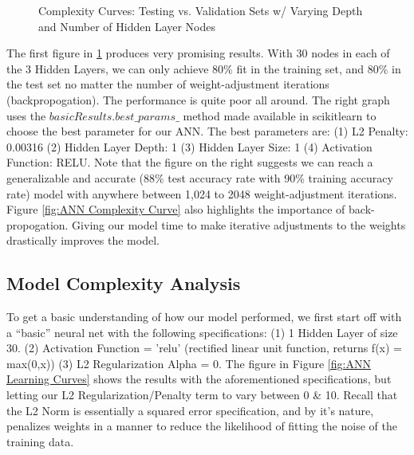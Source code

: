 \documentclass[letterpaper,12pt]{article}
\begin{document}
\begin{figure} %
  \centering
  \hspace{8pt}%
  \caption{Complexity Curves:  Testing vs. Validation Sets w/ Varying Depth and Number of Hidden Layer Nodes}\label{fig:ANN Complexity Curves}
\end{figure}


The first figure in \ref{fig:ANN Complexity Curves} produces very promising results.  With 30 nodes in each of the 3 Hidden Layers, we can only achieve 80\% fit in the training set, and 80\% in the test set no matter the number of weight-adjustment iterations (backpropogation).  The performance is quite poor all around.  The right graph uses the $basicResults.best\_params\_$ method made available in scikitlearn to choose the best parameter for our ANN.  The best parameters are:  (1) L2 Penalty: 0.00316 (2) Hidden Layer Depth: 1 (3) Hidden Layer Size: 1 (4) Activation Function: RELU.  Note that the figure on the right suggests we can reach a generalizable and accurate (88\% test accuracy rate with 90\% training accuracy rate) model with anywhere between 1,024 to 2048 weight-adjustment iterations.  Figure \ref{fig:ANN Complexity Curve} also highlights the importance of back-propogation.  Giving our model time to make iterative adjustments to the weights drastically improves the model.   

\subsection{Model Complexity Analysis}
To get a basic understanding of how our model performed, we first start off with a ``basic'' neural net with the following specifications:  (1) 1 Hidden Layer of size 30.  (2) Activation Function = 'relu' (rectified linear unit function, returns f(x) = max(0,x)) (3) L2 Regularization Alpha = 0.  The figure in Figure \ref{fig:ANN Learning Curves} shows the results with the aforementioned specifications, but letting our L2 Regularization/Penalty term to vary between 0 \& 10.
Recall that the L2 Norm is essentially a squared error specification, and by it's nature, penalizes weights in a manner to reduce the likelihood of fitting the noise of the training data.  
\end{document}
